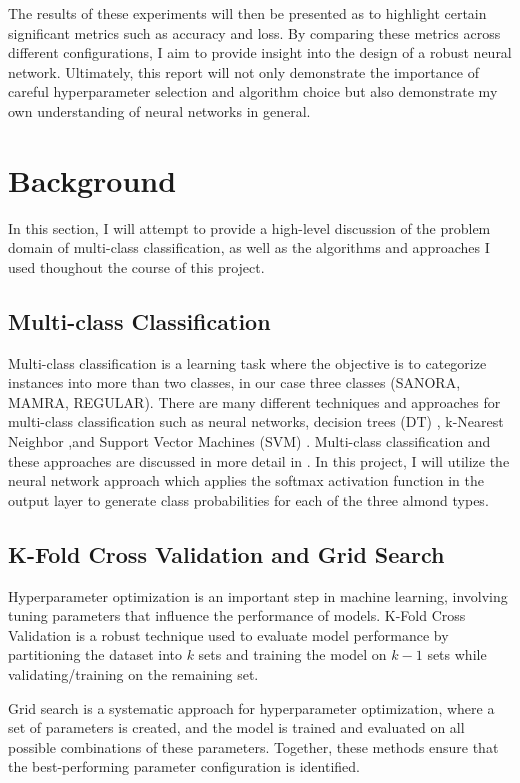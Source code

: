 \documentclass[conference]{IEEEtran}
\begin{document}
The results of these experiments will then be presented as to highlight certain significant metrics such as accuracy and loss. By comparing these metrics across different configurations, I aim to provide insight into the design of a robust neural network. Ultimately, this report will not only demonstrate the importance of careful hyperparameter selection and algorithm choice but also demonstrate my own understanding of neural networks in general.


\section{Background}
In this section, I will attempt to provide a high-level discussion of the problem domain of multi-class classification, as well as the algorithms and approaches I used thoughout the course of this project.\\
\subsection{Multi-class Classification}
Multi-class classification is a learning task where the objective is to categorize instances into more than two classes, in our case three classes (SANORA, MAMRA, REGULAR). There are many different techniques and approaches for multi-class classification such as neural networks, decision trees (DT) \cite{breiman2017classification}, k-Nearest Neighbor \cite{bay1998combining},and Support Vector Machines (SVM) \cite{brereton2010support}. Multi-class classification and these approaches are discussed in more detail in \cite{aly2005survey}. In this project, I will utilize the neural network approach which applies the softmax activation function in the output layer to generate class probabilities for each of the three almond types.

\subsection{K-Fold Cross Validation and Grid Search}
Hyperparameter optimization is an important step in machine learning, involving tuning parameters that influence the performance of models. K-Fold Cross Validation is a robust technique used to evaluate model performance by partitioning the dataset into $k$ sets and training the model on $k-1$ sets while validating/training on the remaining set. 

Grid search is a systematic approach for hyperparameter optimization, where a set of parameters is created, and the model is trained and evaluated on all possible combinations of these parameters. Together, these methods ensure that the best-performing parameter configuration is identified.
\end{document}
